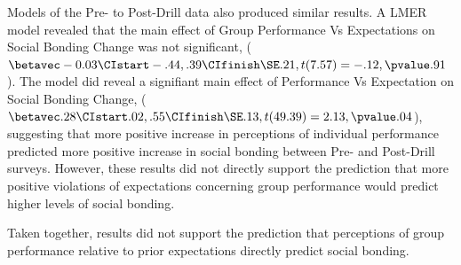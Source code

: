 Models of the Pre- to Post-Drill data also produced similar results.  A LMER model revealed that the main effect of Group Performance Vs Expectations on Social Bonding Change was not significant, ($\betavec -0.03 \CIstart -.44, .39 \CIfinish \SE .21, t(7.57) = -.12, \pvalue .91$). The model did reveal a signifiant main effect of Performance Vs Expectation on Social Bonding Change, ($\betavec .28 \CIstart .02, .55 \CIfinish \SE .13, t(49.39) = 2.13, \pvalue .04$), suggesting that more positive increase in perceptions of individual performance predicted more positive increase in social bonding between Pre- and Post-Drill surveys.  However, these results did not directly support the prediction that more positive violations of expectations concerning group performance would predict higher levels of social bonding.

Taken together, results did not support the prediction that perceptions of group performance relative to prior expectations directly predict social bonding.






